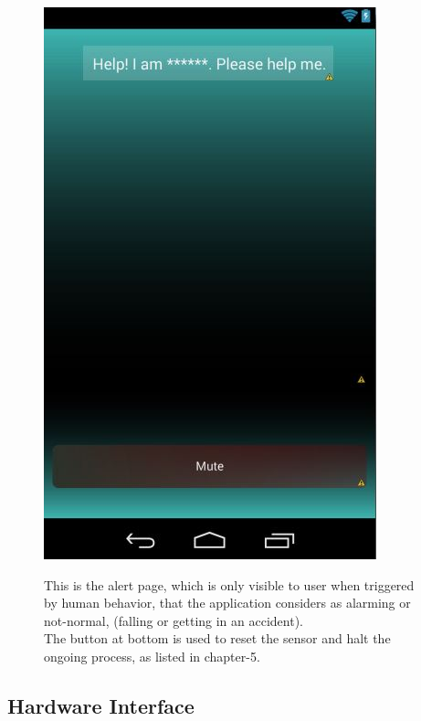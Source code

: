 \begin{figure}[h]
	\centering
	\includegraphics[height=0.35\textheight]{fig01/s_alert}
	\label{fig:RHP05}

This is the alert page, which is only visible to user when triggered by human behavior, that the application considers as alarming or not-normal, (falling or getting in an accident).\\
The button at bottom is used to reset the sensor and halt the ongoing process, as listed in chapter-5.
\end{figure}

\FloatBarrier
\subsection{Hardware Interface}
\label{subsec:subsec02}

